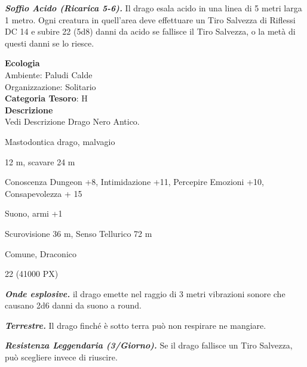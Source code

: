 \begin{multicols}{2}
{\emph{\textbf{Soffio Acido (Ricarica 5-6).}} Il drago esala acido in una linea di 5 metri larga 1 metro. Ogni creatura in quell'area deve effettuare un Tiro Salvezza di Riflessi DC 14 e subire 22 (5d8) danni da acido se fallisce il Tiro Salvezza, o la metà di questi danni se lo riesce.

\textbf{Ecologia}\\
Ambiente: Paludi Calde\\
Organizzazione: Solitario\\
\textbf{Categoria Tesoro}: H\\
\textbf{Descrizione}\\
Vedi Descrizione Drago Nero Antico.

\begin{description}[noitemsep, topsep=0pt, parsep=0pt, partopsep=0pt, itemsep=1pt, leftmargin=2.35cm,  labelwidth=2.2cm, itemindent=0cm, listparindent=0pt] %
\setlength{\baselineskip}{10pt}
\item[\textbf{Taglia/Tipo}] Mastodontica drago, malvagio
\item[\textbf{Caratt.}] 
\item[\textbf{Punti Ferita}] 
\item[\textbf{Movimento}] 12 m, scavare 24 m
\item[\textbf{Tiri Salvez.}] 
\item[\textbf{Comp.}] Conoscenza Dungeon +8, Intimidazione +11, Percepire Emozioni +10, Consapevolezza + 15
\item[\textbf{Imm. Danni}] Suono, armi +1
\item[\textbf{Sensi}] Scurovisione 36 m, Senso Tellurico 72 m
\item[\textbf{Linguaggi}] Comune, Draconico
\item[\textbf{Sfida}] 22 (41000 PX)
\end{description}
\smallskip

\emph{\textbf{Onde esplosive.}} il drago emette nel raggio di 3 metri vibrazioni sonore che causano 2d6 danni da suono a round.

\emph{\textbf{Terrestre.}} Il drago finché è sotto terra può non respirare ne mangiare.

\emph{\textbf{Resistenza Leggendaria (3/Giorno).}} Se il drago fallisce un Tiro Salvezza, può scegliere invece di riuscire.

}
\end{multicols}
